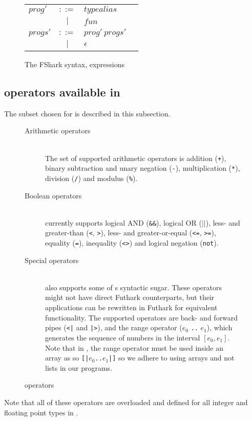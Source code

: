 \begin{figure}
\begin{tabular}{lclr}
    $prog'$ & $::=$ & $typealias$   & \\
            & $|$   & $fun$ & \\

    $progs'$ & $::=$ & $prog'\ progs'$   & \\
             & $|$   & $\epsilon$ & \\
  \end{tabular}
  \caption{The FShark syntax, expressions}
\end{figure}

\clearpage

\subsection*{\fsharp{} operators available in \fshark{}}
The \fsharp{} subset chosen for \fshark{} is described in this subsection.
\begin{figure}[h]
  \centering
\begin{description}
\item[Arithmetic operators]\hfill\\
  The set of supported arithmetic operators is addition (\texttt{+}),
  binary subtraction and unary negation (\texttt{-}), multiplication
  (\texttt{*}), division (\texttt{/}) and modulus (\texttt{\%}).
  
\item[Boolean operators]\hfill\\
  \fshark{} currently supports logical AND (\texttt{\&\&}), logical OR
  (\texttt{$||$}), less- and greater-than (\texttt{<}, \texttt{>}), less- and
  greater-or-equal (\texttt{<=}, \texttt{>=}), equality (\texttt{=}),
  inequality (\texttt{<>}) and logical negation (\texttt{not}).

\item[Special operators]\hfill\\
  \fshark{} also supports some of \fsharp{}s syntactic sugar. These operators
  might not have direct Futhark counterparts, but their applications can be
  rewritten in Futhark for equivalent functionality.
  The supported operators are back- and forward pipes (\texttt{<|} and
  \texttt{|>}), and the range operator ($e_0$ \texttt{..} $e_1$), which
  generates the sequence of numbers in the interval $[e_0,e_1]$. Note that in
  \fshark{}, the range operator must be used inside an array as so
  \texttt{[|$e_0$..$e_1$|]} so we adhere to using arrays and not lists in our
  \fshark{} programs.
\end{description}
  \caption{\fshark{} operators}
  \label{fig:fsharkops}
\end{figure}
Note that all of these operators are overloaded and defined for all integer
and floating point types in \fsharp{}.



